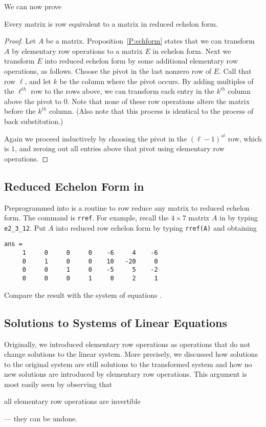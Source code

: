 \documentclass{ximera}
\begin{document}
We can now prove
\begin{thm}  \label{T:redechform}
Every matrix is row equivalent  to a matrix
in reduced echelon form.
\end{thm}

\begin{proof} Let $A$ be a matrix.  Proposition~\ref{P:echform} states
that we can transform $A$ by elementary row operations to a matrix
$E$ in echelon form.  Next we transform $E$ into reduced echelon
form by some additional elementary row operations, as follows.
Choose the pivot in the last nonzero row of $E$.  Call that row
$\ell$, and let $k$ be the column where the pivot occurs.  By
adding multiples of the $\ell^{th}$ row to the rows above, we can
transform each entry in the $k^{th}$ column above the pivot to $0$.
Note that none of these row operations alters the matrix before
the $k^{th}$ column.  (Also note that this process is identical to
the process of back substitution.)

Again we proceed inductively by choosing the pivot in the
$(\ell-1)^{st}$ row, which is $1$, and zeroing out all entries
above that pivot using elementary row operations.  \end{proof}

\subsection*{Reduced Echelon Form in \Matlab}

Preprogrammed into \Matlab is a routine to row reduce any
matrix to reduced echelon form.  The command is
{\tt rref}.
For example, recall the $4\times 7$ matrix $A$ in 
by typing {\tt e2\_3\_12}.  Put $A$ into reduced row echelon
form by typing {\tt rref(A)} and obtaining
\begin{verbatim}
ans =
     1     0     0     0    -6     4    -6
     0     1     0     0    10   -20     0
     0     0     1     0    -5     5    -2
     0     0     0     1     0     2     1
\end{verbatim}
Compare the result with the system of equations .

\subsection*{Solutions to Systems of Linear Equations}

Originally, we introduced elementary row
operations as operations that do not change solutions to the
linear system.  More precisely, we discussed how solutions to
the original system are still solutions to the transformed
system and how no new solutions are introduced by elementary
row operations.  This argument is most easily seen by observing
that
\begin{center}
all elementary row operations are invertible
\end{center}
--- they can be undone.
\end{document}
